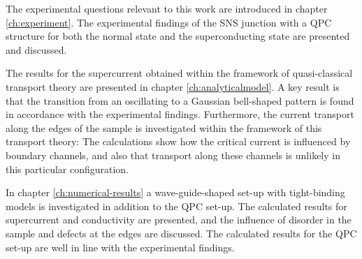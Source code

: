 The experimental questions relevant to this work are introduced in chapter \ref{ch:experiment}. The experimental findings of the SNS junction with a QPC structure for both the normal state and the superconducting state are presented and discussed.

The results for the supercurrent obtained within the framework of quasi-classical transport theory are presented in chapter \ref{ch:analyticalmodel}. A key result is that the transition from an oscillating to a Gaussian bell-shaped pattern is found in accordance with the experimental findings. Furthermore, the current transport along the edges of the sample is investigated within the framework of this transport theory: The calculations show how the critical current is influenced by boundary channels, and also that transport along these channels is unlikely in this particular configuration.

In chapter \ref{ch:numerical-results} a wave-guide-shaped set-up with tight-binding models is investigated in addition to the QPC set-up. The calculated results for supercurrent and conductivity are presented, and the influence of disorder in the sample and defects at the edges are discussed. The calculated results for the QPC set-up are well in line with the experimental findings.
